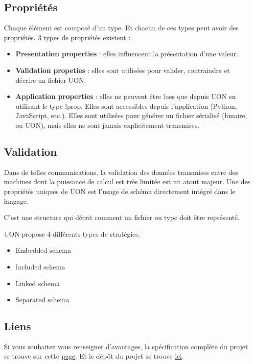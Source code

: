 \documentclass[
    iict, %
    il, %
]{heig-tb}
\begin{document}
\subsection{Propriétés}\label{properties}
Chaque élément est composé d'un type. Et chacun de ces types peut avoir des propriétés.
3 types de propriétés existent :
\begin{itemize}
    \item \textbf{Presentation properties} : elles influencent la présentation d'une valeur.
    \item \textbf{Validation propeties} : elles sont utilisées pour valider, contraindre et décrire un fichier UON.
    \item \textbf{Application properties} : elles ne peuvent être lues que depuis UON en utilisant le type !prop. Elles sont accessibles depuis l'application (Python, JavaScript, etc.). Elles sont utilisées pour générer un fichier sérialisé (binaire, ou UON), mais elles ne sont jamais explicitement transmises.
\end{itemize}

\subsection{Validation}
Dans de telles communications, la validation des données transmises entre des machines dont la puissance de calcul est très limitée est un atout majeur.
Une des propriétés uniques de UON est l'usage de schéma directement intégré dans le langage.

C'est une structure qui décrit comment un fichier ou type doit être représenté.

UON propose 4 différents types de stratégies.

\begin{itemize}
    \item Embedded schema
    \item Included schema
    \item Linked schema
    \item Separated schema
\end{itemize}


\subsection{Liens}
Si vous souhaitez vous renseigner d'avantages, la spécification complète du projet se trouve sur cette \href{https://github.com/uon-language/specification/}{page}.
Et le dépôt du projet se trouve \href{https://github.com/uon-language/specification}{ici}.
\end{document}
